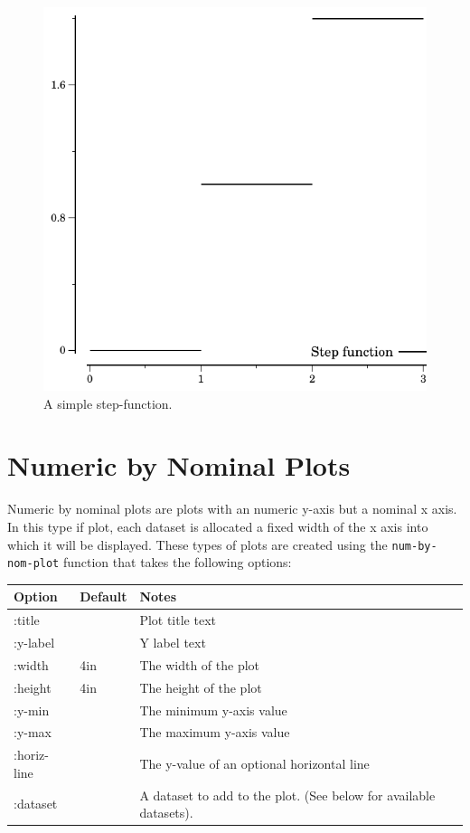 \documentclass{article}
\begin{document}
\begin{figure}[t]
\begin{center}
\includegraphics{step_func}
\caption{\label{fig:step}A simple step-function.}
\end{center}
\end{figure}

\section{\label{sect:num-by-nom} Numeric by Nominal Plots}

Numeric by nominal plots are plots with an numeric y-axis but a
nominal x axis.  In this type if plot, each dataset is allocated a
fixed width of the x axis into which it will be displayed.  These
types of plots are created using the {\tt num-by-nom-plot} function
that takes the following options:


\begin{center}
\begin{tabular}{lll}
Option & Default & Notes \\
\hline
:title & & Plot title text\\
:y-label & & Y label text\\
:width & 4in & The width of the plot\\
:height & 4in & The height of the plot\\
:y-min & & The minimum y-axis value\\
:y-max & & The maximum y-axis value\\
:horiz-line & & The y-value of an optional horizontal line\\
:dataset & & A dataset to add to the plot.  (See below for available
datasets).\\
\end{tabular}
\end{center}
\end{document}
